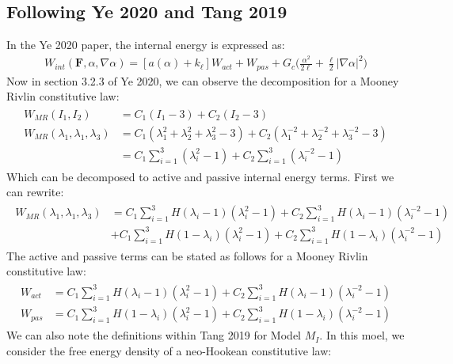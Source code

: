 \documentclass[12pt,3p]{article}
\numberwithin{equation}{section}
\begin{document}
\subsection{Following Ye 2020 and Tang 2019}
In the Ye 2020 paper, the internal energy is expressed as:
\begin{align*}
W_{int} (\mathbf{F}, \alpha, \nabla \alpha) = [a(\alpha) + k_{\ell}] W_{act} + W_{pas} + G_c \bigg( \frac{\alpha^2}{2 \ell} + \frac{\ell}{2} | \nabla \alpha|^2 \bigg) 
\end{align*}
Now in section 3.2.3 of Ye 2020, we can observe the decomposition for a Mooney Rivlin constitutive law:
\begin{align*}
\begin{split}
W_{MR} (I_1, I_2) &= C_1 (I_1 - 3) + C_2 (I_2 - 3) \\
W_{MR} (\lambda_1, \lambda_1, \lambda_3) &= C_1 (\lambda_1^2 + \lambda_2^2 + \lambda_3^2 - 3) + C_2 (\lambda_1^{-2} + \lambda_2^{-2} + \lambda_3^{-2} - 3) \\
			&= C_1 \sum_{i = 1}^{3} (\lambda_i^2 - 1) + C_2 \sum_{i=1}^3 (\lambda_i^{-2} - 1) 
\end{split}
\end{align*}
Which can be decomposed to active and passive internal energy terms. First we can rewrite: 
\begin{align*}
\begin{split}
W_{MR} (\lambda_1, \lambda_1, \lambda_3) 
	&= C_1 \sum_{i = 1}^{3} H(\lambda_i - 1) (\lambda_i^2 - 1) + C_2 \sum_{i=1}^3 H(\lambda_i - 1) (\lambda_i^{-2} - 1) \\
	&+ C_1 \sum_{i = 1}^{3} H(1 - \lambda_i) (\lambda_i^2 - 1) + C_2 \sum_{i=1}^3 H(1 - \lambda_i) (\lambda_i^{-2} - 1) 
\end{split}
\end{align*}
The active and passive terms can be stated as follows for a Mooney Rivlin constitutive law: 
\begin{align*}
\begin{split}
W_{act} &= C_1 \sum_{i = 1}^{3} H(\lambda_i - 1) (\lambda_i^2 - 1) + C_2 \sum_{i=1}^3 H(\lambda_i - 1) (\lambda_i^{-2} - 1) \\
W_{pas} &= C_1 \sum_{i = 1}^{3} H(1 - \lambda_i) (\lambda_i^2 - 1) + C_2 \sum_{i=1}^3 H(1 - \lambda_i) (\lambda_i^{-2} - 1) 
\end{split}
\end{align*}
We can also note the definitions within Tang 2019 for Model $M_I$. In this moel, we consider the free energy density of a neo-Hookean constitutive law:
\end{document}
